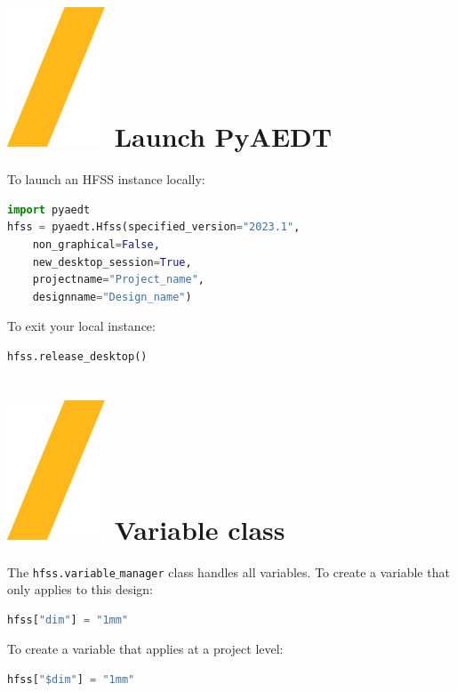 \documentclass[9pt,landscape]{article}
\begin{document}
\begin{multicols}{3}
\setlength{\premulticols}{1pt}
\setlength{\postmulticols}{1pt}
\setlength{\multicolsep}{1pt}
\setlength{\columnsep}{2pt}

\section{\includegraphics[height=\fontcharht\font`\S]{slash.png} Launch PyAEDT}
To launch an HFSS instance locally:
\begin{lstlisting}[language=Python]
import pyaedt
hfss = pyaedt.Hfss(specified_version="2023.1",
	non_graphical=False,
	new_desktop_session=True,
	projectname="Project_name",
	designname="Design_name")
\end{lstlisting}
To exit your local instance:
\begin{lstlisting}[language=Python]
hfss.release_desktop()
\end{lstlisting}
\section{\includegraphics[height=\fontcharht\font`\S]{slash.png} Variable class}
The \texttt{hfss.variable$\_$manager} class handles all variables.
\newline
To create a variable that only applies to this design:
\begin{lstlisting}[language=Python]
hfss["dim"] = "1mm"
\end{lstlisting}
To create a variable that applies at a project level:
\begin{lstlisting}[language=Python]
hfss["$dim"] = "1mm"
\end{lstlisting}

\end{multicols}
\end{document}
